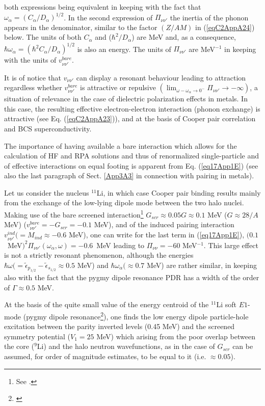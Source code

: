 both expressions being equivalent in keeping with the fact that $\omega_\alpha=(C_\alpha/D_\alpha)^{1/2}$. In the second expression of $\Pi_{\nu\nu'}$  the inertia of the phonon appears in the denominator, similar to the factor $(Z/AM)$  in (\ref{eqC2AppA24}) below. The units of both $C_\alpha$ and ($\hbar^2/D_\alpha$) are  MeV and, as a consequence, $\hbar\omega_\alpha=(\hbar^2C_\alpha/D_\alpha)^{1/2}$ is also an energy. The units of $\Pi_{\nu\nu'}$ are MeV$^{-1}$ in keeping with the units of  $v^{bare}_{\nu\nu'}$. 

It is of notice that $v_{\nu\nu'}$ can display a resonant behaviour leading to attraction regardless whether $v_{\nu\nu'}^{bare}$ is attractive or repulsive $(\lim_{\omega-\omega_\alpha\to0^-}\Pi_{\nu\nu'}\to-\infty)$, a situation of relevance in the case of dielectric polarization effects in metals. In this case, the resulting effective electron-electron interaction (phonon exchange) is attractive (see Eq. (\ref{eqC2AppA23})), and  at the basis of Cooper pair correlation and BCS superconductivity.

The importance of having available a bare interaction which allows for the calculation of HF and RPA solutions and thus of renormalized single-particle and of effective interactions on equal footing is apparent from Eq. (\ref{eq17App1E}) (see also the last paragraph of Sect. \ref{App3A3} in connection with pairing in metals).

Let us consider the nucleus $^{11}$Li, in which case Cooper pair binding results mainly from the exchange of the low-lying dipole mode between the two halo nuclei. Making use of the bare screened interaction\footnote{See \cite{Broglia:19b}.} $G_{scr}\approx0.05G\approx0.1$ MeV ($G\approx 28/A$ MeV) ($v_{\nu\nu'}^{bare}=-G_{scr}=-0.1$ MeV), and of the induced pairing interaction $v^{ind}_{\nu\nu'}(=M_{ind}\approx-0.6$ MeV), one can write for the last term in (\ref{eq17App1E}), \mbox{$(0.1$ MeV$)^2\Pi_{\nu\nu'}(\omega_\alpha,\omega)=-0.6$ MeV} leading to $\Pi_{\nu\nu}=-60$ MeV$^{-1}$. This large effect is not a strictly resonant phenomenon, although the energies $\hbar\omega(=\tilde\epsilon_{p_{1/2}}-\tilde\epsilon_{s_{1/2}}\approx0.5$ MeV) and $\hbar\omega_\alpha(\approx0.7$ MeV) are rather similar, in keeping also with the fact that the pygmy dipole resonance PDR has a width of the order of $\Gamma\approx0.5$ MeV.

At the basis of the quite small value of the energy centroid of the $^{11}$Li soft $E1$-mode (pygmy dipole resonance\footnote{\cite{Broglia:19}}), one finds the low energy dipole particle-hole excitation between the parity inverted levels (0.45 MeV) and the screened symmetry potential ($V_1=25$ MeV) which arising from the poor overlap between the core ($^9$Li) and the halo neutron wavefunctions, as in the case of $G_{scr}$ can be assumed, for order of magnitude estimates, to be equal to it (i.e. $\approx0.05$). 


